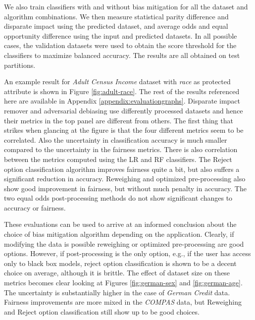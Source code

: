 \documentclass{article}
\begin{document}





We also train classifiers with and without bias mitigation for all the dataset and algorithm combinations. We then measure statistical parity difference and disparate impact using the predicted dataset, and average odds and equal opportunity difference using the input and predicted datasets. In all possible cases, the validation datasets were used to obtain the score threshold for the classifiers to maximize balanced accuracy. The results are all obtained on test partitions.

An example result for \textit{Adult Census Income} dataset with \textit{race}
as protected attribute is shown in Figure \ref{fig:adult-race}. The rest of the results referenced here are available in Appendix \ref{appendix:evaluationgraphs}. Disparate impact remover and adversarial debiasing use differently processed datasets and hence their metrics in the top panel are different from others. The first thing that strikes when glancing at the figure is that the four different metrics seem to be correlated. Also the uncertainty in classification accuracy is much smaller compared to the uncertainty in the fairness metrics. There is also correlation between the metrics computed using the LR and RF classifiers. The Reject option classification algorithm improves fairness quite a bit, but also suffers a significant reduction in accuracy. Reweighing and optimized pre-processing also show good improvement in fairness, but without much penalty in accuracy. The two equal odds post-processing methods do not show significant changes to accuracy or fairness.

These evaluations can be used to arrive at an informed conclusion about the choice of bias mitigation algorithm depending on the application. Clearly, if modifying the data is possible reweighing or optimized pre-processing are good options.  However, if post-processing is the only option, e.g., if the user has access only to black box models, reject option classification is shown to be a decent choice on average, although it is brittle. The effect of dataset size on these metrics becomes clear looking at Figures \ref{fig:german-sex} and \ref{fig:german-age}. The uncertainty is substantially higher in the case of \textit{German Credit} data. Fairness improvements are more mixed in the \textit{COMPAS} data, but Reweighing and Reject option classification still show up to be good choices.
\end{document}
